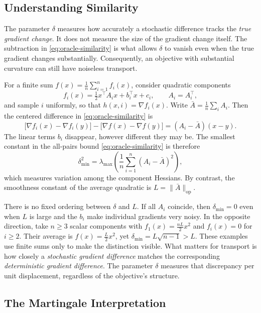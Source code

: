 \subsection{Understanding Similarity}
\label{subsec:understanding-similarity}

The parameter $\delta$ measures how accurately a stochastic difference
tracks the \emph{true gradient change}. It does not measure the size of the
gradient change itself. The subtraction in
\eqref{eq:oracle-similarity} is what allows $\delta$ to vanish even when
the true gradient changes substantially. Consequently, an objective with
substantial curvature can still have noiseless transport.

For a finite sum $f(x)=\frac1n\sum_{i=1}^n f_i(x)$, consider quadratic
components
\[
f_i(x)=\tfrac12 x^\top A_i x+b_i^\top x+c_i,
\qquad A_i=A_i^\top,
\]
and sample $i$ uniformly, so that $h(x,i)=\nabla f_i(x)$. Write
$\bar A=\frac1n\sum_i A_i$. Then the centered difference in
\eqref{eq:oracle-similarity} is
\begin{equation}
\label{eq:quadratic-difference-noise}
\bigl[\nabla f_i(x)-\nabla f_i(y)\bigr]
-\bigl[\nabla f(x)-\nabla f(y)\bigr]
  =(A_i-\bar A)(x-y).
\end{equation}
The linear terms $b_i$ disappear, however different they may be. The
smallest constant in the all-pairs bound \eqref{eq:oracle-similarity}
is therefore
\[
\delta_{\min}^2
  =\lambda_{\max}\!\left(
    \frac1n\sum_{i=1}^n(A_i-\bar A)^2
  \right),
\]
which measures variation among the component Hessians. By contrast, the
smoothness constant of the average quadratic is
$L=\|\bar A\|_{\mathrm{op}}$.

There is no fixed ordering between $\delta$ and $L$. If all $A_i$ coincide,
then $\delta_{\min}=0$ even when $L$ is large and the $b_i$ make individual
gradients very noisy. In the opposite direction, take $n\geq3$ scalar
components with $f_1(x)=\frac{nL}{2}x^2$ and $f_i(x)=0$ for $i\geq2$.
Their average is $f(x)=\frac L2x^2$, yet
$\delta_{\min}=L\sqrt{n-1}>L$. These examples use finite sums only to make
the distinction visible. What matters for transport is how closely a
\emph{stochastic gradient difference} matches the corresponding
\emph{deterministic gradient difference}. The parameter $\delta$ measures
that discrepancy per unit displacement, regardless of the objective's
structure.

\subsection{The Martingale Interpretation}
\label{subsec:martingale-interpretation}

